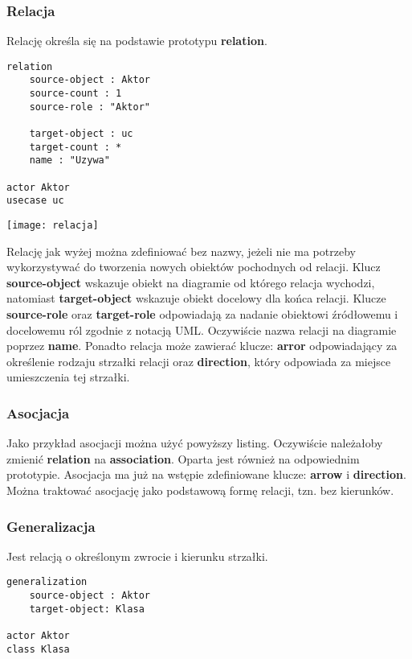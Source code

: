 \subsubsection{Relacja}

Relację określa się na podstawie prototypu \textbf{relation}.
\begin{lstlisting}
relation
    source-object : Aktor
    source-count : 1
    source-role : "Aktor"

    target-object : uc
    target-count : *
    name : "Uzywa"

actor Aktor
usecase uc
\end{lstlisting}

\begin{center}
\texttt{[image: relacja]}
\end{center}

Relację jak wyżej można zdefiniować bez nazwy, jeżeli nie ma potrzeby wykorzystywać do tworzenia nowych obiektów pochodnych od relacji. Klucz \textbf{source-object} wskazuje obiekt na diagramie od którego relacja wychodzi, natomiast \textbf{target-object} wskazuje obiekt docelowy dla końca relacji. Klucze \textbf{source-role} oraz \textbf{target-role} odpowiadają za nadanie obiektowi źródłowemu i docelowemu ról zgodnie z notacją UML. Oczywiście nazwa relacji na diagramie poprzez \textbf{name}. Ponadto relacja może zawierać klucze: \textbf{arror} odpowiadający za określenie rodzaju strzałki relacji oraz \textbf{direction}, który odpowiada za miejsce umieszczenia tej strzałki.

\subsubsection{Asocjacja}

Jako przykład asocjacji można użyć powyższy listing. Oczywiście należałoby zmienić \textbf{relation} na \textbf{association}. Oparta jest również na odpowiednim prototypie. Asocjacja ma już na wstępie zdefiniowane klucze: \textbf{arrow} i \textbf{direction}. Można traktować asocjację jako podstawową formę relacji, tzn. bez kierunków.

\subsubsection{Generalizacja}

Jest relacją o określonym zwrocie i kierunku strzałki.
\begin{lstlisting}
generalization
    source-object : Aktor
    target-object: Klasa

actor Aktor
class Klasa
\end{lstlisting}

